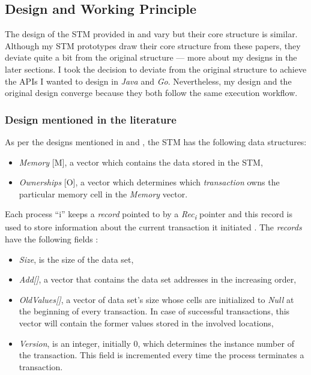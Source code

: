 \documentclass[../main]{subfiles}
\begin{document}
  \subsection{Design and Working Principle}

  \par
  The design of the STM provided in \cite{Shavit1997} and \cite{weimerskirch2008software} vary but their core structure is similar. Although my STM prototypes draw their core structure from these papers, they deviate quite a bit from the original structure --- more about my designs in the later sections. I took the decision to deviate from the original structure to achieve the APIs I wanted to design in {\em Java} and {\em Go}. Nevertheless, my design and the original design converge because they both follow the same execution workflow. \par

  \subsubsection{Design mentioned in the literature}

  \par
  As per the designs mentioned in \cite{Shavit1997} and \cite{weimerskirch2008software}, the STM has the following data structures:

  \begin{itemize}
    \item {\em Memory} [M], a vector which contains the data stored in the STM,

    \item {\em Ownerships} [O], a vector which determines which {\em transaction} owns the particular memory cell in the {\em Memory} vector.
  \end{itemize}

  \par
  Each process ``i'' keeps a {\em record} pointed to by a {\em Rec\textsubscript{i}} pointer and this record is used to store information about the current transaction it initiated \cite{Shavit1997}\cite{weimerskirch2008software}. The {\em records} have the following fields \cite{Shavit1997}\cite{weimerskirch2008software}: \par

  \begin{itemize}
    \item {\em Size}, is the size of the data set,

    \item {\em Add[]}, a vector that contains the data set addresses in the increasing order,

    \item {\em OldValues[]}, a vector of data set's size whose cells are initialized to {\em Null} at the beginning of every transaction. In case of successful transactions, this vector will contain the former values stored in the involved locations,

    \item {\em Version}, is an integer, initially 0, which determines the instance number of the transaction. This field is incremented every time the process terminates a transaction.
  \end{itemize}
\end{document}
